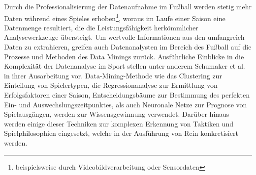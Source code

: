 Durch die Professionalisierung der Datenaufnahme im Fußball werden stetig mehr Daten während eines Spieles erhoben\footnote{beispielsweise durch Videobildverarbeitung oder Sensordaten}, woraus im Laufe einer Saison eine Datenmenge resultiert, die die Leistungsfähigkeit herkömmlicher Analysewerkzeuge übersteigt. Um wertvolle Informationen aus den umfangreich Daten zu extrahieren, greifen auch Datenanalysten im Bereich des Fußball auf die Prozesse und Methoden des Data Minings zurück. Ausführliche Einblicke in die Komplexität der Datenanalyse im Sport stellen unter anderem Schumaker et al. in ihrer Ausarbeitung vor. Data-Mining-Methode wie das Clustering zur Einteilung von Spielertypen, die Regressionanalyse zur Ermittlung von Erfolgsfaktoren einer Saison, Entscheidungsbäume zur Bestimmung des perfekten Ein- und Auswechslungszeitpunktes, als auch Neuronale Netze zur Prognose von Spielausgängen, werden zur Wissensgewinnung verwendet. Darüber hinaus werden einige dieser Techniken zur komplexen Erkennung von Taktiken und Spielphilosophien eingesetzt, welche in der Ausführung von Rein konkretisiert werden.



